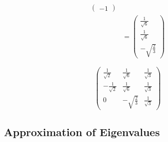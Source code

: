 \documentclass{article}
\begin{document}
\begin{enumerate}
\begin{align*}
\begin{pmatrix}
                                                  -1
                                                \end{pmatrix}                                           \\
                         & = \begin{pmatrix}
                               \frac{1}{\sqrt{6}} \\
                               \frac{1}{\sqrt{6}} \\
                               -\sqrt{\frac{2}{3}}
                             \end{pmatrix}
        \end{align*}

        \[\begin{pmatrix}
            \frac{1}{\sqrt{2}}  & \frac{1}{\sqrt{6}}  & \frac{1}{\sqrt{3}} \\
            -\frac{1}{\sqrt{2}} & \frac{1}{\sqrt{6}}  & \frac{1}{\sqrt{3}} \\
            0                   & -\sqrt{\frac{2}{3}} & \frac{1}{\sqrt{3}}
          \end{pmatrix}\]
\end{enumerate}

\subsection{Approximation of Eigenvalues}

\subsubsection{}
\end{document}
